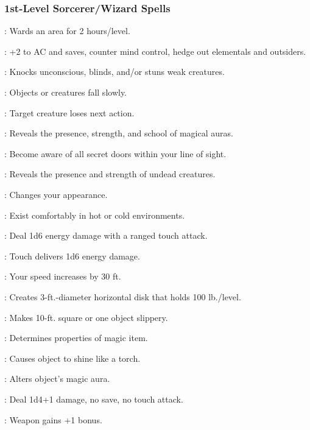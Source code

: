 \subsubsection{1st-Level Sorcerer/Wizard Spells}
\begin{list}{}{\leftmargin=1em}
\item {}: Wards an area for 2 hours/level.
\item {}: +2 to AC and saves, counter mind control, hedge out elementals and outsiders.
\item {}: Knocks unconscious, blinds, and/or stuns weak creatures.
\item {}: Objects or creatures fall slowly.
\item {}: Target creature loses next action.
\item {}: Reveals the presence, strength, and school of magical auras.
\item {}: Become aware of all secret doors within your line of sight.
\item {}: Reveals the presence and strength of undead creatures.
\item {}: Changes your appearance.
\item {}: Exist comfortably in hot or cold environments.
\item {}: Deal 1d6 energy damage with a ranged touch attack.
\item {}: Touch delivers 1d6 energy damage.
\item {}: Your speed increases by 30 ft.
\item {}: Creates 3-ft.-diameter horizontal disk that holds 100 lb./level.
\item {}: Makes 10-ft. square or one object slippery.
\item {}: Determines properties of magic item.
\item {}: Causes object to shine like a torch.
\item {}: Alters object's magic aura.
\item {}: Deal 1d4+1 damage, no save, no touch attack.
\item {}: Weapon gains +1 bonus.

\end{list}
